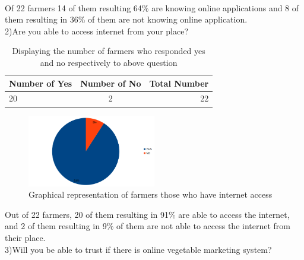\documentclass[12pt]{report}
\begin{document}
\begin{normalsize}
\begin{figure}[h]
	\label{myLabel}		%
	\end{figure}
\newline\\[0.1cm]Of 22 farmers 14 of them resulting 64\% are knowing online applications and 8 of them resulting in 36\% of them are not knowing online application.\newline\\[0.1cm]
2)Are you able to access internet from your place?\newline\\[0.1cm]
\begin{table}[h]       %
		\centering
		\begin{tabular}{ | l | c | r | } \hline
		\textbf{Number of Yes} & \textbf{Number of No} & \textbf{Total Number} \\ \hline			
		20 & 2 & 22 \\ \hline
		\end{tabular}
		\caption{Displaying the number of farmers who responded yes and no respectively to above question}
		\label{5.0}
	    \end{table}
\begin{figure}[h]       %
	\centering
	\includegraphics[width=0.5\textwidth]{farmer 2.png} 
	\caption{Graphical representation of farmers those who have internet access }
	\label{myLabel}		%
	\end{figure}
	\newpage
Out of 22 farmers, 20 of them resulting in 91\% are able to access the internet, and 2 of them resulting in 9\% of them are not able to access the internet from their place.\newline\\[0.1cm]	
3)Will you be able to trust if there is online vegetable marketing system?\newline\\[0.1cm]
\begin{table}[h]       %

\end{table}
\end{normalsize}
\end{document}
